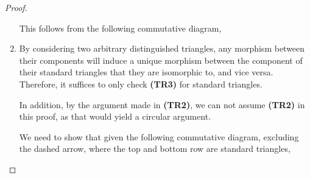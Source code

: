 \begin{proof}
\begin{enumerate}[label={(\bfseries TR\arabic*)}]
{            This follows from the following commutative diagram,
            \begin{center}
            \end{center}
        }
        \item {
            By considering two arbitrary distinguished triangles, any morphism between their components will induce a unique morphism between the component of their standard triangles that they are isomorphic to, and vice versa. Therefore, it suffices to only check {\bf (TR3)} for standard triangles.

            In addition, by the argument made in {\bf (TR2)}, we can not assume {\bf (TR2)} in this proof, as that would yield a circular argument.

            We need to show that given the following commutative diagram, excluding the dashed arrow, where the top and bottom row are standard triangles,
            \begin{diagramlabel}[\label{eq:stablemod}]
\end{diagramlabel}}
\end{enumerate}
\end{proof}
